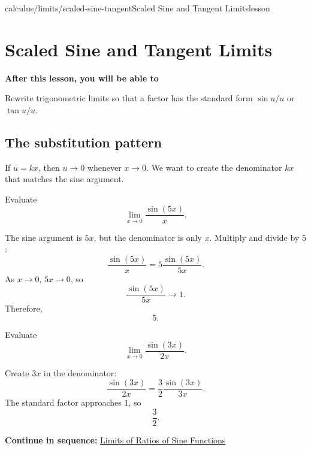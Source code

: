 \documentclass[11pt,openany]{book}
\theoremstyle{bgplain}
\newcounter{bgexample}[chapter]
\newcommand{\webnext}[2]{%
  \par\addvspace{1.2em}\noindent{\color{BGLine}\rule{\textwidth}{0.35pt}}\par\smallskip
  {\small\color{BGGray}\textbf{Continue in sequence:} \hyperlink{web:#1}{#2}}\par
}
\newcommand{\lessonobjective}[1]{%
  \par\Needspace{4\baselineskip}\addvspace{0.6em}%
  {\bfseries\color{BGInk}After this lesson, you will be able to}\par\smallskip
  #1\par\addvspace{0.5em}%
}
\begin{document}
\begin{webpage}{calculus/limits/scaled-sine-tangent}{Scaled Sine and Tangent Limits}{lesson}
\section{Scaled Sine and Tangent Limits}

\lessonobjective{
Rewrite trigonometric limits so that a factor has the standard form \(\sin u/u\) or \(\tan u/u\).
}

\subsection{The substitution pattern}

If \(u=kx\), then \(u\to0\) whenever \(x\to0\). We want to create the denominator \(kx\) that matches the sine argument.

\begin{bgexample}[title={\(\sin(5x)/x\)}]
Evaluate
\[
  \lim_{x\to0}\frac{\sin(5x)}{x}.
\]

\begin{bgsolution}
The sine argument is \(5x\), but the denominator is only \(x\). Multiply and divide by \(5\):
\[
  \frac{\sin(5x)}{x}
  =5\frac{\sin(5x)}{5x}.
\]
As \(x\to0\), \(5x\to0\), so
\[
  \frac{\sin(5x)}{5x}\to1.
\]
Therefore,
\[
  \boxed{5}.
\]
\end{bgsolution}
\end{bgexample}

\begin{bgguided}[title={Keep the outside constant}]
Evaluate
\[
  \lim_{x\to0}\frac{\sin(3x)}{2x}.
\]

\begin{bgsolution}
Create \(3x\) in the denominator:
\[
  \frac{\sin(3x)}{2x}
  =\frac32\frac{\sin(3x)}{3x}.
\]
The standard factor approaches \(1\), so
\[
  \boxed{\frac32}.
\]
\end{bgsolution}
\end{bgguided}
\webnext{calculus/limits/ratio-of-sines}{Limits of Ratios of Sine Functions}
\end{webpage}
\end{document}
